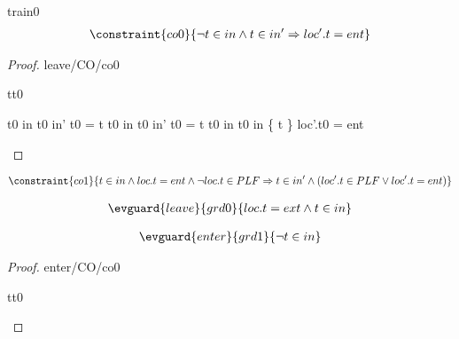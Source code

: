 \documentclass[12pt]{amsart}
\begin{document}
\begin{machine}{train0}
%
\begin{align*}
\constraint{co0}
{	\neg t \in in \land t \in in' \implies  loc'.t = ent } %
\end{align*}
%
\begin{proof}{leave/CO/co0}
	\begin{free:var}{t}{t0}
	\begin{calculation}
		\neg t0 \in in \land t0 \in in'
	\hint{=}{ \ref{grd0} }
		\neg t0 = t \land \neg t0 \in in \land t0 \in in' 
	\hint{=}{ \ref{a0} }
		\neg t0 = t \land \neg t0 \in in \land t0 \in in \bunion \{ t \} 
		\false
		loc'.t0 = ent
	\end{calculation}
	\end{free:var}
\end{proof}
%
\begin{align*}
\constraint{co1}
{	 t \in in \land loc.t = ent  \land \neg loc.t \in PLF 
\implies t \in in' \land (loc'.t \in PLF \lor loc'.t = ent)	}
\end{align*}


%

\begin{align*}
\evguard{leave}{grd0}
{	loc.t = ext \land t \in in	}
\end{align*}

\begin{align*}
\evguard{enter}{grd1}
{	\neg t \in in	}
\end{align*}

\begin{proof}{enter/CO/co0}
	\begin{free:var}{t}{t0}


\end{free:var}
\end{proof}
\end{machine}
\end{document}

